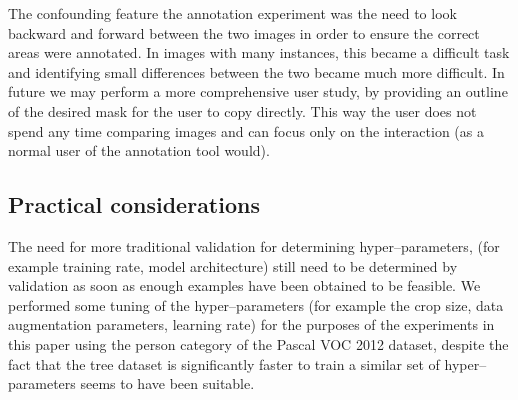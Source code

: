 \begin{table*}[!ht]
  \centering
    \caption{Statistics from annotating validation set in different ways. Precision, recall and IOU are a comparison with the original validation set. Note figures in brackets are the original statistics of the un-modified predictions from the model}

\noindent{}

\label{tab:annotation_exp}
\end{table*}


The confounding feature the annotation experiment was the need to look backward and forward between the two images in order to ensure the correct areas were annotated. In images with many instances, this became a difficult task and identifying small differences between the two became much more difficult. In future we may perform a more comprehensive user study, by providing an outline of the desired mask for the user to copy directly. This way the user does not spend any time comparing images and can focus only on the interaction (as a normal user of the annotation tool would).


\subsection{Practical considerations}

The need for more traditional validation for determining hyper--parameters, (for example training rate, model architecture) still need to be determined by validation as soon as enough examples have been obtained to be feasible. We performed some tuning of the hyper--parameters (for example the crop size, data augmentation parameters, learning rate) for the purposes of the experiments in this paper using the person category of the Pascal \gls{VOC} 2012 dataset, despite the fact that the tree dataset is significantly faster to train a similar set of hyper--parameters seems to have been suitable.


